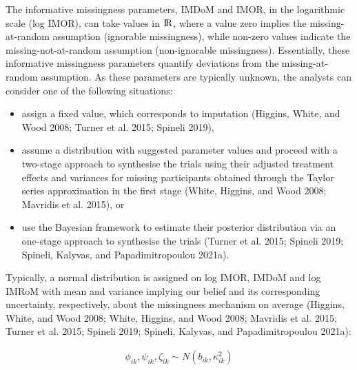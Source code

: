 The informative missingness parameters, IMDoM and IMOR, in the logarithmic scale (log IMOR), can take values in \({\rm I\!R}\), where a value zero implies the missing-at-random assumption (ignorable missingness), while non-zero values indicate the missing-not-at-random assumption (non-ignorable missingness). Essentially, these informative missingness parameters quantify deviations from the missing-at-random assumption. As these parameters are typically unknown, the analysts can consider one of the following situations:

\begin{itemize}
\tightlist
\item
  assign a fixed value, which corresponds to imputation (Higgins, White, and Wood 2008; Turner et al. 2015; Spineli 2019),
\item
  assume a distribution with suggested parameter values and proceed with a two-stage approach to synthesise the trials using their adjusted treatment effects and variances for missing participants obtained through the Taylor series approximation in the first stage (White, Higgins, and Wood 2008; Mavridis et al. 2015), or
\item
  use the Bayesian framework to estimate their posterior distribution via an one-stage approach to synthesise the trials (Turner et al. 2015; Spineli 2019; Spineli, Kalyvas, and Papadimitropoulou 2021a).
\end{itemize}

Typically, a normal distribution is assigned on log IMOR, IMDoM and log IMRoM with mean and variance implying our belief and its corresponding uncertainty, respectively, about the missingness mechanism on average (Higgins, White, and Wood 2008; White, Higgins, and Wood 2008; Mavridis et al. 2015; Turner et al. 2015; Spineli 2019; Spineli, Kalyvas, and Papadimitropoulou 2021a):

\[\begin{aligned}
\phi_{ik}, \psi_{ik}, \zeta_{ik} \sim N(b_{ik}, \kappa^{2}_{ik})
\end{aligned}\]

